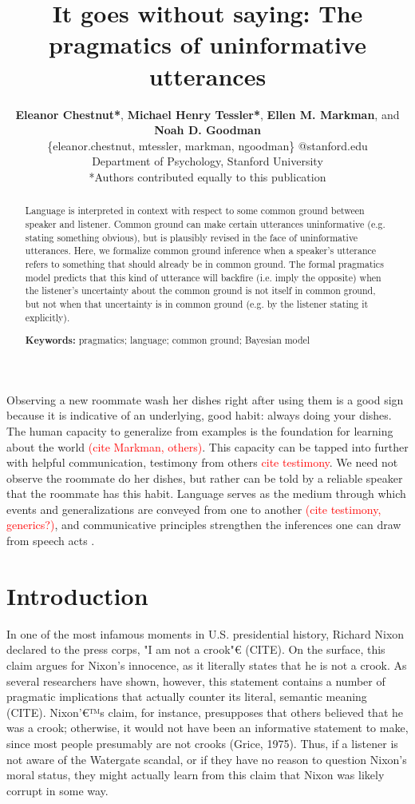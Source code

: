 \documentclass[10pt,letterpaper]{article}
\title{It goes without saying: The pragmatics of uninformative utterances}
\author{{\large \bf Eleanor Chestnut*}, {\large \bf Michael Henry Tessler*},
{\large \bf Ellen M. Markman}, and {\large \bf Noah D. Goodman}  \\
\{eleanor.chestnut, mtessler, markman, ngoodman\} @stanford.edu \\ 
  Department of Psychology, Stanford University \\
  *Authors contributed equally to this publication}
\newcommand{\red}[1]{\textcolor{Red}{#1}}
\begin{document}
\maketitle


\begin{abstract}

Language is interpreted in context with respect to some common ground between speaker and listener.
Common ground can make certain utterances uninformative (e.g. stating something obvious), but is plausibly revised in the face of uninformative utterances.
Here, we formalize common ground inference when a speaker's utterance refers to something that should already be in common ground.
The formal pragmatics model predicts that this kind of utterance will backfire (i.e. imply the opposite) when the listener's uncertainty about the common ground is not itself in common ground, but not when that uncertainty is in common ground (e.g. by the listener stating it explicitly). 


\textbf{Keywords:} 
pragmatics; language; common ground; Bayesian model

\end{abstract}


Observing a new roommate wash her dishes right after using them is a good sign because it is indicative of an underlying, good habit: always doing your dishes.
The human capacity to generalize from examples is the foundation for learning about the world \red{(cite Markman, others)}.
This capacity can be tapped into further with helpful communication, testimony from others \red{cite testimony}. 
We need not observe the roommate do her dishes, but rather can be told by a reliable speaker that the roommate has this habit.
Language serves as the medium through which events and generalizations are conveyed from one to another \red{(cite testimony, generics?)}, and communicative principles strengthen the inferences one can draw from speech acts \cite{Grice1975}. 


\section{Introduction}

In one of the most infamous moments in U.S. presidential history, Richard Nixon declared to the press corps, "I am not a crook"€ (CITE).  On the surface, this claim argues for Nixon's innocence, as it literally states that he is not a crook.  As several researchers have shown, however, this statement contains a number of pragmatic implications that actually counter its literal, semantic meaning (CITE).  Nixon'€™s claim, for instance, presupposes that others believed that he was a crook; otherwise, it would not have been an informative statement to make, since most people presumably are not crooks (Grice, 1975).  Thus, if a listener is not aware of the Watergate scandal, or if they have no reason to question Nixon's moral status, they might actually learn from this claim that Nixon was likely corrupt in some way.
\end{document}
